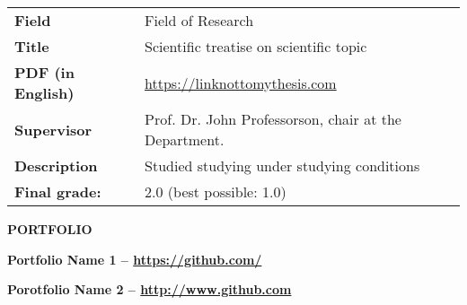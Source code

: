 \documentclass[11pt,english]{article}
\begin{document}
\begin{minipage}{\textwidth}


  
    \begin{tabular}{ @{} p{32mm} p{135mm} @{} }

    \small \bf Field & \small Field of Research \\
    \small \bf Title & \small Scientific treatise on scientific topic \\
    \small \bf PDF (in English) & \small \url{https://linknottomythesis.com} \\
    \small \bf Supervisor & \small Prof. Dr. John Professorson, chair at the Department. \\
    \small \bf Description & \small Studied studying under studying conditions \\
    \small \bf \small \color{maingrey} Final grade: & \small \color{maingrey} 2.0 (best possible: 1.0) \\
    
    \end{tabular}
    \vspace{1mm}
  
  \vspace{4mm}


\end{minipage}%
%
%
%
%
%
%
%

\medskip

\selectfont

\hspace{-20mm}\colorbox{maincolor}{\begin{minipage}[t][8mm][c]{75mm}
\hspace{20mm}\bfseries \color{white}  PORTFOLIO
\end{minipage}}
\vspace{6mm}

\begin{minipage}{\textwidth}


  
    {\bf Portfolio Name 1 -- \color{maincolor}\url{https://github.com/} }
    \vspace{1mm}
  
    {\bf Porotfolio Name 2 -- \color{maincolor}\url{http://www.github.com} }
    \vspace{1mm}
  
  \vspace{5mm}


\end{minipage}%
%
%
%
%
%
%
%
\end{document}

